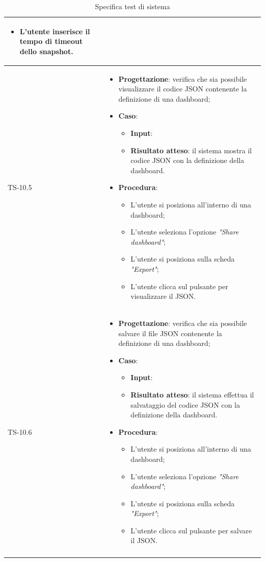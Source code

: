 \begin{longtable}{|C{2.5cm}|C{13cm}|}
\begin{itemize}
\begin{itemize}
		\item L'utente inserisce il tempo di timeout dello snapshot.
	\end{itemize} 
\end{itemize}
	\\
	\hline
	{TS-10.5} &
\begin{itemize}
	\item \textbf{Progettazione}: verifica che sia possibile visualizzare il
	codice JSON contenente la definizione di una dashboard;
	\item \textbf{Caso}: 
	\begin{itemize}
		\item \textbf{Input}: 
		\item \textbf{Risultato atteso}: il sistema mostra il codice JSON con la definizione della dashboard.
	\end{itemize}
	\item \textbf{Procedura}:
	\begin{itemize}
		\item L'utente si posiziona all'interno di una dashboard;
		\item L'utente seleziona l'opzione \emph{"Share dashboard"};
		\item L'utente si posiziona sulla scheda \emph{"Export"};
		\item L'utente clicca sul pulsante per visualizzare il JSON.
	\end{itemize} 
\end{itemize}
	  \\
	\hline
	{TS-10.6} & 
\begin{itemize}
	\item \textbf{Progettazione}: verifica che sia possibile salvare il file
	JSON contenente la definizione di una dashboard;
	\item \textbf{Caso}: 
	\begin{itemize}
		\item \textbf{Input}: 
		\item \textbf{Risultato atteso}: il sistema effettua il salvataggio del codice JSON con la definizione della dashboard.
	\end{itemize}
	\item \textbf{Procedura}:
	\begin{itemize}
		\item L'utente si posiziona all'interno di una dashboard;
		\item L'utente seleziona l'opzione \emph{"Share dashboard"};
		\item L'utente si posiziona sulla scheda \emph{"Export"};
		\item L'utente clicca sul pulsante per salvare il JSON.
	\end{itemize} 
\end{itemize}
	 \\
	\hline
	\caption{Specifica test di sistema}
	\label{tabella:specifica TS}
\end{longtable}
\renewcommand{\arraystretch}{1}
\newpage

